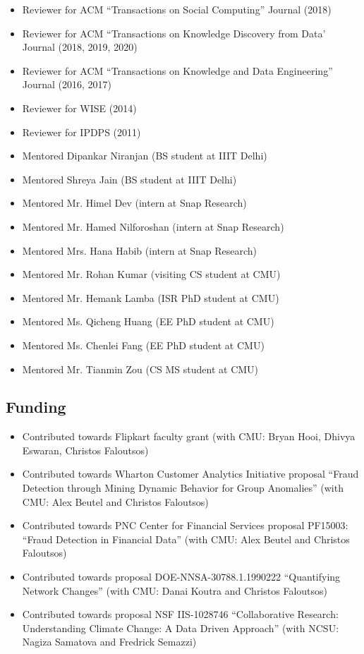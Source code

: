 \documentclass{article}
\begin{document}
\begin{itemize}
 \item Reviewer for ACM ``Transactions on Social Computing'' Journal (2018)
 \item Reviewer for ACM ``Transactions on Knowledge Discovery from Data' Journal (2018, 2019, 2020)
 \item Reviewer for ACM ``Transactions on Knowledge and Data Engineering'' Journal (2016, 2017)
 \item Reviewer for WISE (2014)
 \item Reviewer for IPDPS (2011)
 \item Mentored Dipankar Niranjan (BS student at IIIT Delhi)
 \item Mentored Shreya Jain (BS student at IIIT Delhi)
 \item Mentored Mr. Himel Dev (intern at Snap Research)
 \item Mentored Mr. Hamed Nilforoshan (intern at Snap Research)
 \item Mentored Mrs. Hana Habib (intern at Snap Research)
 \item Mentored Mr. Rohan Kumar (visiting CS student at CMU)
 \item Mentored Mr. Hemank Lamba (ISR PhD student at CMU)
 \item Mentored Ms. Qicheng Huang (EE PhD student at CMU)
 \item Mentored Ms. Chenlei Fang (EE PhD student at CMU)
 \item Mentored Mr. Tianmin Zou (CS MS student at CMU)
\end{itemize}

\subsection*{\bf {Funding}}
\begin{itemize}
\item Contributed towards Flipkart faculty grant (with CMU: Bryan Hooi, Dhivya Eswaran, Christos Faloutsos)
\item Contributed towards Wharton Customer Analytics Initiative proposal ``Fraud Detection through Mining Dynamic Behavior for Group Anomalies'' (with CMU: Alex Beutel and Christos Faloutsos)
\item Contributed towards PNC Center for Financial Services proposal PF15003: ``Fraud Detection in Financial Data'' (with CMU: Alex Beutel and Christos Faloutsos)
\item Contributed towards proposal DOE-NNSA-30788.1.1990222 ``Quantifying Network Changes'' (with CMU: Danai Koutra and Christos Faloutsos)
\item Contributed towards proposal NSF IIS-1028746 ``Collaborative Research:  Understanding Climate Change: A Data Driven Approach'' (with NCSU: Nagiza Samatova and Fredrick Semazzi)
\end{itemize}
\end{document}
